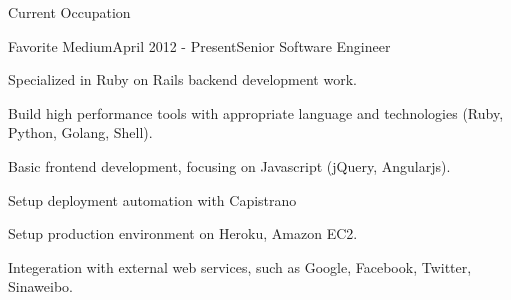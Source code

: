 \documentclass{resume} %
\begin{document}
\begin{rSection}{Current Occupation}

\begin{rSubsection}{Favorite Medium}{April 2012 - Present}{Senior Software Engineer}{}{}
\begin{rSubsectionList}
\item Specialized in Ruby on Rails backend development work.
\item Build high performance tools with appropriate language and technologies (Ruby, Python, Golang, Shell).
\item Basic frontend development, focusing on Javascript (jQuery, Angularjs).
\item Setup deployment automation with Capistrano
\item Setup production environment on Heroku, Amazon EC2.
\item Integeration with external web services, such as Google, Facebook, Twitter, Sinaweibo.
\end{rSubsectionList}
\end{rSubsection}
\end{rSection}
\end{document}
